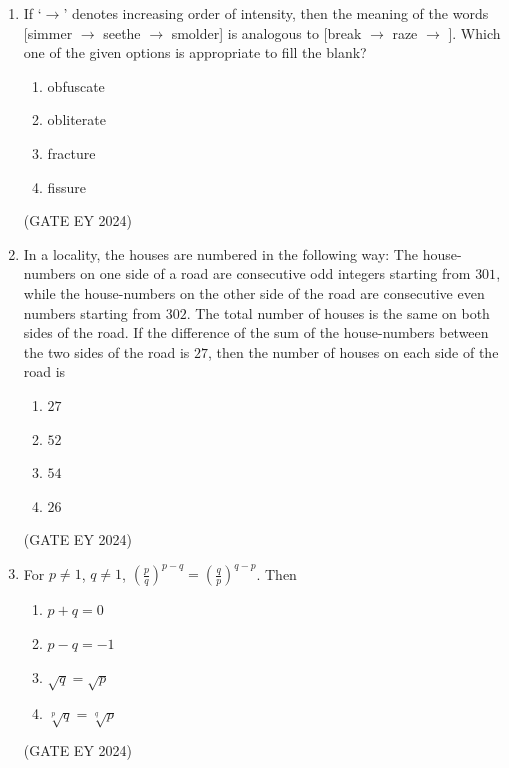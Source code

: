 \documentclass[journal]{IEEEtran}
\begin{document}
\begin{enumerate}
    \item If `$\rightarrow$' denotes increasing order of intensity, then the meaning of the words [simmer $\rightarrow$ seethe $\rightarrow$ smolder] is analogous to [break $\rightarrow$ raze $\rightarrow$ \underline{\hspace{3cm}} ]. Which one of the given options is appropriate to fill the blank?
    \begin{multicols}{2}
    \begin{enumerate}
        \item obfuscate
        \item obliterate
        \item fracture
        \item fissure
    \end{enumerate}
    \end{multicols}
\hfill{(GATE EY 2024)}

    \item In a locality, the houses are numbered in the following way: The house-numbers on one side of a road are consecutive odd integers starting from $301$, while the house-numbers on the other side of the road are consecutive even numbers starting from $302$. The total number of houses is the same on both sides of the road. If the difference of the sum of the house-numbers between the two sides of the road is $27$, then the number of houses on each side of the road is
    \begin{multicols}{2}
    \begin{enumerate}
        \item $27$
        \item $52$
        \item $54$
        \item $26$
    \end{enumerate}
    \end{multicols}
\hfill{(GATE EY 2024)}

    \item For $p \neq 1$, $q \neq 1$, $(\frac{p}{q})^{p-q} = (\frac{q}{p})^{q-p}$. Then
    \begin{multicols}{2}
    \begin{enumerate}
        \item $p+q = 0$
        \item $p-q = -1$
        \item $\sqrt{q} = \sqrt{p}$
        \item $\sqrt[p]{q} = \sqrt[q]{p}$
    \end{enumerate}
    \end{multicols}
\hfill{(GATE EY 2024)}


\end{enumerate}
\end{document}

